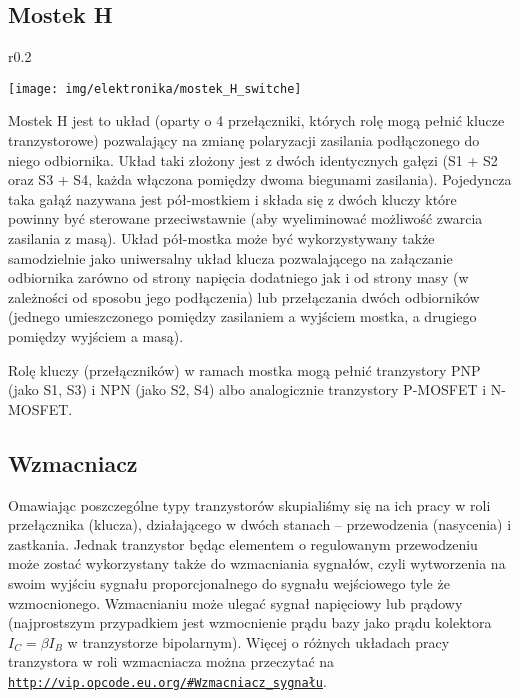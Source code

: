 \clearpage

\subsection{Mostek H}

\begin{wrapfigure}{r}{0.2\textwidth}
  \begin{center}
    \vspace{-33pt}
    \texttt{[image: img/elektronika/mostek\_H\_switche]}
    \vspace{-27pt}
  \end{center}
\end{wrapfigure}

Mostek H jest to układ (oparty o 4 przełączniki, których rolę mogą pełnić klucze tranzystorowe) pozwalający na zmianę polaryzacji zasilania podłączonego do niego odbiornika. Układ taki złożony jest z dwóch identycznych gałęzi (S1 + S2 oraz S3 + S4, każda włączona pomiędzy dwoma biegunami zasilania). Pojedyncza taka gałąź nazywana jest pół-mostkiem i składa się z dwóch kluczy które powinny być sterowane przeciwstawnie (aby wyeliminować możliwość zwarcia zasilania z masą). Układ pół-mostka może być wykorzystywany także samodzielnie jako uniwersalny układ klucza pozwalającego na załączanie odbiornika zarówno od strony napięcia dodatniego jak i od strony masy (w zależności od sposobu jego podłączenia) lub przełączania dwóch odbiorników (jednego umieszczonego pomiędzy zasilaniem a wyjściem mostka, a drugiego pomiędzy wyjściem a masą).

Rolę kluczy (przełączników) w ramach mostka mogą pełnić tranzystory PNP (jako S1, S3) i NPN (jako S2, S4) albo analogicznie tranzystory P-MOSFET i N-MOSFET.

\subsection{Wzmacniacz}

Omawiając poszczególne typy tranzystorów skupialiśmy się na ich pracy w roli przełącznika (klucza), działającego w dwóch stanach – przewodzenia (nasycenia) i zastkania.
Jednak tranzystor będąc elementem o regulowanym przewodzeniu może zostać wykorzystany także do wzmacniania sygnałów, czyli wytworzenia na swoim wyjściu sygnału proporcjonalnego do sygnału wejściowego tyle że wzmocnionego.
Wzmacnianiu może ulegać sygnał napięciowy lub prądowy (najprostszym przypadkiem jest wzmocnienie prądu bazy jako prądu kolektora $I_C = \beta I_B$ w tranzystorze bipolarnym).
Więcej o różnych układach pracy tranzystora w roli wzmacniacza można przeczytać na \href{http://vip.opcode.eu.org/#Wzmacniacz_sygna\%C5\%82u}{\texttt{http://vip.opcode.eu.org/\#Wzmacniacz\_sygnału}}.

